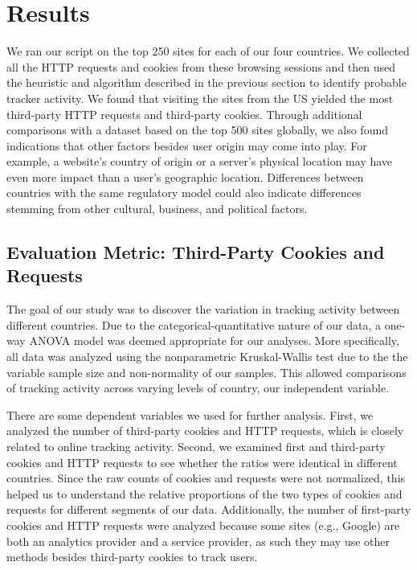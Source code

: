 \documentclass[conference]{IEEEtran}
\newcommand{\todo}[1]{}
\renewcommand{\todo}[1]{{\color{red} TODO: {#1}}}
\begin{document}
\section{Results}
We ran our script on the top 250 sites for each of our four countries.  We collected all the HTTP requests and cookies from these browsing sessions and then used the heuristic and algorithm described in the previous section to identify probable tracker activity.  We found that visiting the sites from the US yielded the most third-party HTTP requests and third-party cookies. Through additional comparisons with a dataset based on the top 500 sites globally, we also found indications that other factors besides user origin may come into play. For example, a website's country of origin or a server's physical location may have even more impact than a user's geographic location. Differences between countries with the same regulatory model could also indicate differences stemming from other cultural, business, and political factors. 

\subsection{Evaluation Metric: Third-Party Cookies and Requests}
The goal of our study was to discover the variation in tracking activity between different countries. Due to the categorical-quantitative nature of our data, a one-way ANOVA model was deemed appropriate for our analyses. More specifically, all data was analyzed using the nonparametric Kruskal-Wallis test due to the the variable sample size and non-normality of our samples. This allowed comparisons of tracking activity across varying levels of country, our independent variable.

There are some dependent variables we used for further analysis. First, we analyzed the number of third-party cookies and HTTP requests, which is closely related to online tracking activity. Second, we examined first and third-party cookies and HTTP requests to see whether the ratios were identical in different countries. Since the raw counts of cookies and requests were not normalized, this helped us to understand the relative proportions of the two types of cookies and requests for different segments of our data. Additionally, the number of first-party cookies and HTTP requests were analyzed because some sites (e.g., Google) are both an analytics provider and a service provider, as such they may use other methods besides third-party cookies to track users. 
\end{document}
